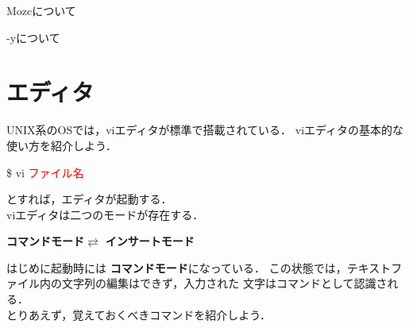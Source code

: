 \documentclass[dvipdfmx,a4paper,11pt]{jsbook}
\begin{document}
\begin{subbox}{Mozcについて}

\end{subbox}


\begin{subbox}{-yについて}

\end{subbox}

\section{エディタ}
UNIX系のOSでは，viエディタが標準で搭載されている．
viエディタの基本的な使い方を紹介しよう．
\begin{tcolorbox}[terminalbox]
  \$ vi \textcolor{red}{ファイル名}
\end{tcolorbox}
\noindent とすれば，エディタが起動する．\\
viエディタは二つのモードが存在する．
\begin{center}
  \textbf{コマンドモード}$\rightleftarrows$ \textbf{インサートモード}
\end{center}
はじめに起動時には
\textbf{コマンドモード}になっている．
この状態では，テキストファイル内の文字列の編集はできず，入力された
文字はコマンドとして認識される．\\
とりあえず，覚えておくべきコマンドを紹介しよう．
\end{document}
